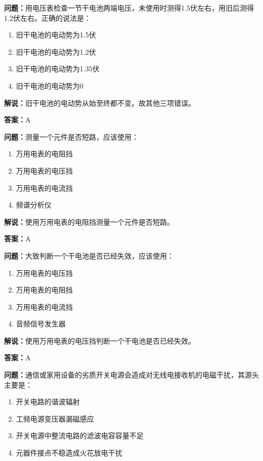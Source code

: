 \textbf{问题：}用电压表检查一节干电池两端电压，未使用时测得1.5伏左右，用旧后测得1.2伏左右。正确的说法是：

\begin{enumerate}[label=\Alph*), leftmargin=3em]
	\item 旧干电池的电动势为1.5伏
	\item 旧干电池的电动势为1.2伏
	\item 旧干电池的电动势为1.35伏
	\item 旧干电池的电动势为0
\end{enumerate}

\textbf{解说：}旧干电池的电动势从始至终都不变。故其他三项错误。%

\textbf{答案：}A

\textbf{问题：}测量一个元件是否短路，应该使用：

\begin{enumerate}[label=\Alph*), leftmargin=3em]
	\item 万用电表的电阻挡
	\item 万用电表的电压挡
	\item 万用电表的电流挡
	\item 频谱分析仪
\end{enumerate}

\textbf{解说：}使用万用电表的电阻挡测量一个元件是否短路。%

\textbf{答案：}A

\textbf{问题：}大致判断一个干电池是否已经失效，应该使用：

\begin{enumerate}[label=\Alph*), leftmargin=3em]
	\item 万用电表的电压挡
	\item 万用电表的电阻挡
	\item 万用电表的电流挡
	\item 音频信号发生器
\end{enumerate}

\textbf{解说：}使用万用电表的电压挡判断一个干电池是否已经失效。%

\textbf{答案：}A

\textbf{问题：}通信或家用设备的劣质开关电源会造成对无线电接收机的电磁干扰，其源头主要是：

\begin{enumerate}[label=\Alph*), leftmargin=3em]
	\item 开关电路的谐波辐射
	\item 工频电源变压器漏磁感应
	\item 开关电源中整流电路的滤波电容容量不足
	\item 元器件接点不稳造成火花放电干扰
\end{enumerate}


